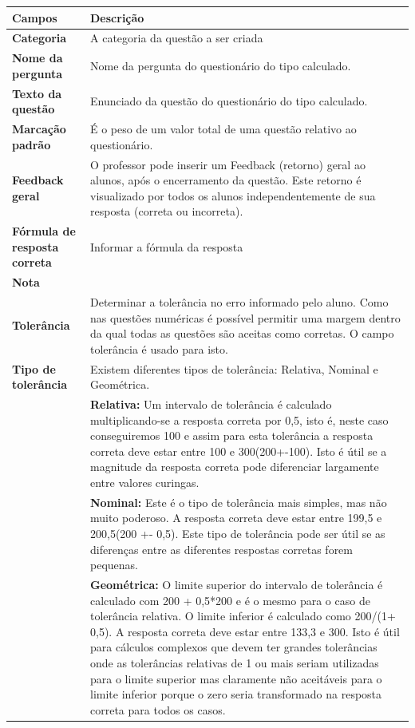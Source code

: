 \begin{longtable}{p{6cm}|p{9cm}}
     \hline
     \rowcolor[rgb]{0.8,0.8,0.8} \textbf{Campos} &  \textbf{Descrição}\\\hline
    \textbf{Categoria} &  A categoria da questão a ser criada \\\hline
    \textbf{Nome da pergunta} & Nome da pergunta do questionário do tipo calculado. \\\hline
    \textbf{Texto da questão} & Enunciado da questão do questionário do tipo calculado. \\\hline
    \textbf{Marcação padrão} & É o peso de um valor total de uma questão relativo ao questionário.\\\hline
    \textbf{Feedback geral} &  O professor  pode inserir um  Feedback (retorno)  geral  ao alunos,  após o encerramento da questão. Este retorno é visualizado por todos os alunos independentemente de sua resposta (correta ou incorreta). \\\hline
    \textbf{Fórmula de resposta correta} &     Informar a fórmula da resposta     \\\hline
    \textbf{Nota} &         \\\hline
    \textbf{Tolerância} & Determinar a tolerância no erro informado pelo aluno. Como nas questões numéricas é possível permitir uma margem dentro da qual todas as questões são aceitas como corretas. O campo tolerância é usado para isto.  \\\hline
    \textbf{Tipo de tolerância} & Existem diferentes tipos de tolerância: Relativa, Nominal e Geométrica.\\
&\textbf{Relativa:} Um intervalo de tolerância é calculado multiplicando-se a resposta correta por 0,5, isto é, neste caso conseguiremos 100 e assim para esta tolerância a resposta correta deve estar entre 100 e 300(200+-100). Isto é útil se a magnitude da resposta correta pode diferenciar largamente entre valores curingas.\\
&\textbf{Nominal:} Este é o tipo de tolerância mais simples, mas não muito poderoso. A resposta correta deve estar entre 199,5 e 200,5(200 +- 0,5). Este tipo de tolerância pode ser útil se as diferenças entre as diferentes respostas corretas forem pequenas. \\
&\textbf{Geométrica:} O limite superior do intervalo de tolerância é calculado com 200 + 0,5*200 e é o mesmo para o caso de tolerância relativa. O limite inferior é calculado como 200/(1+ 0,5). A resposta correta deve estar entre 133,3 e 300. Isto é útil para cálculos complexos que devem ter grandes tolerâncias onde as tolerâncias relativas de 1 ou mais seriam utilizadas para o limite superior mas claramente não aceitáveis para o limite inferior porque o zero seria transformado na resposta correta para todos os casos.\\\hline

\end{longtable}
